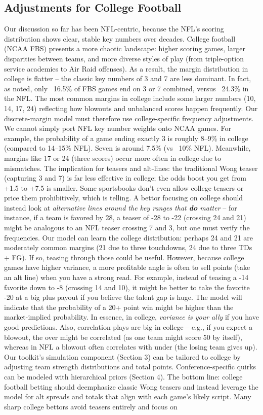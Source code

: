 \documentclass[11pt]{amsart}
\begin{document}
\subsection{Adjustments for College Football}
Our discussion so far has been NFL-centric, because the NFL’s scoring distribution shows clear, stable key numbers over decades. College football (NCAA FBS) presents a more chaotic landscape: higher scoring games, larger disparities between teams, and more diverse styles of play (from triple-option service academies to Air Raid offenses). As a result, the margin distribution in college is flatter – the classic key numbers of 3 and 7 are less dominant. In fact, as noted, only ~16.5\% of FBS games end on 3 or 7 combined, versus ~24.3\% in the NFL. The most common margins in college include some larger numbers (10, 14, 17, 24) reflecting how blowouts and unbalanced scores happen frequently. Our discrete-margin model must therefore use college-specific frequency adjustments. We cannot simply port NFL key number weights onto NCAA games. For example, the probability of a game ending exactly 3 is roughly 8–9\% in college (compared to 14–15\% NFL). Seven is around 7.5\% (vs ~10\% NFL). Meanwhile, margins like 17 or 24 (three scores) occur more often in college due to mismatches. The implication for teasers and alt-lines: the traditional Wong teaser (capturing 3 and 7) is far less effective in college; the odds boost you get from +1.5 to +7.5 is smaller. Some sportsbooks don’t even allow college teasers or price them prohibitively, which is telling. A bettor focusing on college should instead look at \emph{alternative lines around the key ranges that \textbf{do} matter} – for instance, if a team is favored by 28, a teaser of -28 to -22 (crossing 24 and 21) might be analogous to an NFL teaser crossing 7 and 3, but one must verify the frequencies. Our model can learn the college distribution: perhaps 24 and 21 are moderately common margins (21 due to three touchdowns, 24 due to three TDs + FG). If so, teasing through those could be useful. However, because college games have higher variance, a more profitable angle is often to sell points (take an alt line) when you have a strong read. For example, instead of teasing a -14 favorite down to -8 (crossing 14 and 10), it might be better to take the favorite -20 at a big plus payout if you believe the talent gap is huge. The model will indicate that the probability of a 20+ point win might be higher than the market-implied probability. In essence, in college, \emph{variance is your ally} if you have good predictions. Also, correlation plays are big in college – e.g., if you expect a blowout, the over might be correlated (as one team might score 50 by itself), whereas in NFL a blowout often correlates with under (the losing team gives up). Our toolkit’s simulation component (Section 3) can be tailored to college by adjusting team strength distributions and total points. Conference-specific quirks can be modeled with hierarchical priors (Section 4). The bottom line: college football betting should deemphasize classic Wong teasers and instead leverage the model for alt spreads and totals that align with each game’s likely script. Many sharp college bettors avoid teasers entirely and focus on 
\end{document}
